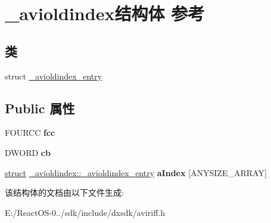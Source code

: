 \hypertarget{struct__avioldindex}{}\section{\+\_\+avioldindex结构体 参考}
\label{struct__avioldindex}
\subsection*{类}
\begin{DoxyCompactItemize}
\item 
struct \hyperlink{struct__avioldindex_1_1__avioldindex__entry}{\+\_\+avioldindex\+\_\+entry}
\end{DoxyCompactItemize}
\subsection*{Public 属性}
\begin{DoxyCompactItemize}
\item 
\mbox{\label{struct__avioldindex_a65e389bce97892017cf0cc0e97c6f7e0}} 
F\+O\+U\+R\+CC {\bfseries fcc}
\item 
\mbox{\label{struct__avioldindex_acf552f4e9b069edfedc5cbdac6e63da8}} 
D\+W\+O\+RD {\bfseries cb}
\item 
\mbox{\label{struct__avioldindex_a10c247fed9c038193e9e3af1c013a401}} 
\hyperlink{interfacestruct}{struct} \hyperlink{struct__avioldindex_1_1__avioldindex__entry}{\+\_\+avioldindex\+::\+\_\+avioldindex\+\_\+entry} {\bfseries a\+Index} \mbox{[}A\+N\+Y\+S\+I\+Z\+E\+\_\+\+A\+R\+R\+AY\mbox{]}
\end{DoxyCompactItemize}


该结构体的文档由以下文件生成\+:\begin{DoxyCompactItemize}
\item 
E\+:/\+React\+O\+S-\/0../sdk/include/dxsdk/aviriff.\+h\end{DoxyCompactItemize}
